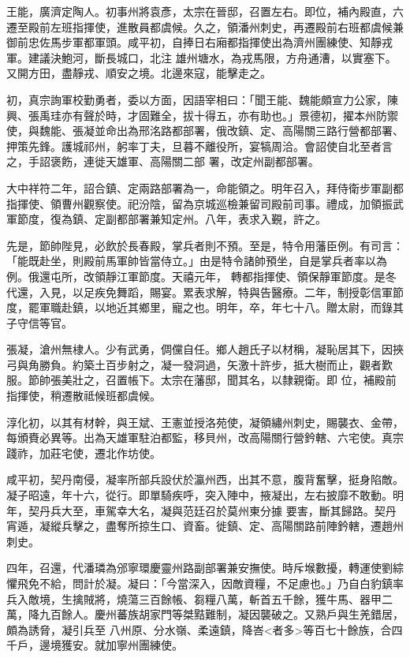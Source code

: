 \begin{pinyinscope}
 王能，廣濟定陶人。初事州將袁彥，太宗在晉邸，召置左右。即位，補內殿直，六遷至殿前左班指揮使，進散員都虞候。久之，領潘州刺史，再遷殿前右班都虞候兼御前忠佐馬步軍都軍頭。咸平初，自捧日右廂都指揮使出為濟州團練使、知靜戎軍。建議決鮑河，斷長城口，北注
 雄州塘水，為戎馬限，方舟通漕，以實塞下。又開方田，盡靜戎、順安之境。北邊來寇，能擊走之。



 初，真宗詢軍校勤勇者，委以方面，因語宰相曰：「聞王能、魏能頗宣力公家，陳興、張禹珪亦有聲於時，才固難全，拔十得五，亦有助也。」景德初，擢本州防禦使，與魏能、張凝並命出為邢洺路都部署，俄改鎮、定、高陽關三路行營都部署、押策先鋒。護城祁州，躬率丁夫，旦暮不離役所，宴犒周洽。會詔使自北至者言之，手詔褒飭，連徙天雄軍、高陽關二部
 署，改定州副都部署。



 大中祥符二年，詔合鎮、定兩路部署為一，命能領之。明年召入，拜侍衛步軍副都指揮使、領曹州觀察使。祀汾陰，留為京城巡檢兼留司殿前司事。禮成，加領振武軍節度，復為鎮、定副都部署兼知定州。八年，表求入覲，許之。



 先是，節帥陛見，必飲於長春殿，掌兵者則不預。至是，特令用藩臣例。有司言：「能既赴坐，則殿前馬軍帥皆當侍立。」由是特令諸帥預坐，自是掌兵者率以為例。俄還屯所，改領靜江軍節度。天禧元年，
 轉都指揮使、領保靜軍節度。是冬代還，入見，以足疾免舞蹈，賜宴。累表求解，特與告醫療。二年，制授彰信軍節度，罷軍職赴鎮，以地近其鄉里，寵之也。明年，卒，年七十八。贈太尉，而錄其子守信等官。



 張凝，滄州無棣人。少有武勇，倜儻自任。鄉人趙氏子以材稱，凝恥居其下，因挾弓與角勝負。約築土百步射之，凝一發洞過，矢激十許步，抵大樹而止，觀者歎服。節帥張美壯之，召置帳下。太宗在藩邸，聞其名，以隸親衛。即
 位，補殿前指揮使，稍遷散祗候班都虞候。



 淳化初，以其有材幹，與王斌、王憲並授洛苑使，凝領繡州刺史，賜襲衣、金帶，每頒賚必異等。出為天雄軍駐泊都監，移貝州，改高陽關行營鈐轄、六宅使。真宗踐祚，加莊宅使，遷北作坊使。



 咸平初，契丹南侵，凝率所部兵設伏於瀛州西，出其不意，腹背奮擊，挺身陷敵。凝子昭遠，年十六，從行。即單騎疾呼，突入陣中，掖凝出，左右披靡不敢動。明年，契丹兵大至，車駕幸大名，凝與范廷召於莫州東分據
 要害，斷其歸路。契丹宵遁，凝縱兵擊之，盡奪所掠生口、資畜。徙鎮、定、高陽關路前陣鈐轄，遷趙州刺史。



 四年，召還，代潘璘為邠寧環慶靈州路副部署兼安撫使。時斥堠數擾，轉運使劉綜懼飛免不給，問計於凝。凝曰：「今當深入，因敵資糧，不足慮也。」乃自白豹鎮率兵入敵境，生擒賊將，燒蕩三百餘帳、芻糧八萬，斬首五千餘，獲牛馬、器甲二萬，降九百餘人。慶州蕃族胡家門等桀黠難制，凝因襲破之。又熟戶與生羌錯居，頗為誘脅，凝引兵至
 八州原、分水嶺、柔遠鎮，降峇<者多>等百七十餘族，合四千戶，邊境獲安。就加寧州團練使。




\end{pinyinscope}
